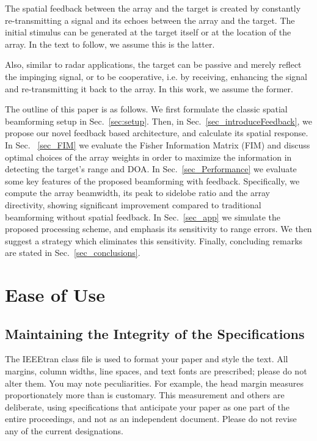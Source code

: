 \documentclass[conference]{IEEEtran}
\begin{document}
The spatial feedback between the array and the target is created by constantly re-transmitting a signal and its echoes between the array and the target. 
The initial stimulus can be generated at the target itself or at the location of the array. In the text to follow, we assume this is the latter. 

Also, similar to radar applications, the target can be passive and merely reflect the impinging signal, or to be cooperative, i.e. by receiving, enhancing the signal and re-transmitting it back to the array. In this work, we assume the former.

\par The outline of this paper is as follows. We first formulate the classic spatial beamforming setup in Sec.~\ref{sec:setup}. Then, in Sec.~\ref{sec_introduceFeedback}, we propose our novel feedback based architecture, and calculate its spatial response. In Sec.~ \ref{sec_FIM} we evaluate the Fisher Information Matrix (FIM) and discuss optimal choices of the array weights in order to  maximize the information in detecting the target's range and DOA. In Sec.~\ref{sec_Performance} we evaluate some key features of the proposed beamforming with feedback. Specifically, we compute the array beamwidth, its peak to sidelobe ratio and the array directivity, showing significant improvement compared to traditional beamforming without spatial feedback. 
In Sec.~\ref{sec_app} we simulate the proposed processing scheme, and emphasis its sensitivity to range errors. We then suggest a strategy which eliminates this sensitivity. Finally, concluding remarks are stated in Sec.~\ref{sec_conclusions}.

\section{Ease of Use}

\subsection{Maintaining the Integrity of the Specifications}

The IEEEtran class file is used to format your paper and style the text. All margins, 
column widths, line spaces, and text fonts are prescribed; please do not 
alter them. You may note peculiarities. For example, the head margin
measures proportionately more than is customary. This measurement 
and others are deliberate, using specifications that anticipate your paper 
as one part of the entire proceedings, and not as an independent document. 
Please do not revise any of the current designations.
\end{document}
